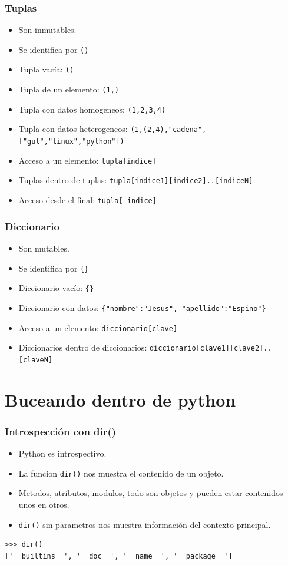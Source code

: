 \documentclass[10pt]{beamer}
\begin{document}
  \begin{frame}[containsverbatim]
    \frametitle{Tuplas}
    \begin{itemize}
        \item Son inmutables.
        \item Se identifica por \verb+()+
        \item Tupla vacía: \verb+()+
        \item Tupla de un elemento: \verb+(1,)+
        \item Tupla con datos homogeneos: \verb+(1,2,3,4)+
        \item Tupla con datos heterogeneos: \verb+(1,(2,4),"cadena",["gul","linux","python"])+
        \item Acceso a un elemento: \verb+tupla[indice]+
        \item Tuplas dentro de tuplas: \verb+tupla[indice1][indice2]..[indiceN]+
        \item Acceso desde el final: \verb+tupla[-indice]+
    \end{itemize}
  \end{frame}

  \begin{frame}[containsverbatim]
    \frametitle{Diccionario}
    \begin{itemize}
        \item Son mutables.
        \item Se identifica por \verb+{}+
        \item Diccionario vacío: \verb+{}+
        \item Diccionario con datos: \verb+{"nombre":"Jesus", "apellido":"Espino"}+
        \item Acceso a un elemento: \verb+diccionario[clave]+
        \item Diccionarios dentro de diccionarios: \verb+diccionario[clave1][clave2]..[claveN]+
    \end{itemize}
  \end{frame}

  \section*{Buceando dentro de python}
  \begin{frame}[containsverbatim]
    \frametitle{Introspección con dir()}
    \begin{itemize}
      \item Python es introspectivo.
      \item La funcion \verb+dir()+ nos muestra el contenido de un objeto.
      \item Metodos, atributos, modulos, todo son objetos y pueden estar
            contenidos unos en otros.
      \item \verb+dir()+ sin parametros nos muestra información del contexto principal.
    \end{itemize}
    \begin{verbatim}
>>> dir()
['__builtins__', '__doc__', '__name__', '__package__']
    \end{verbatim}
  \end{frame}
\end{document}
